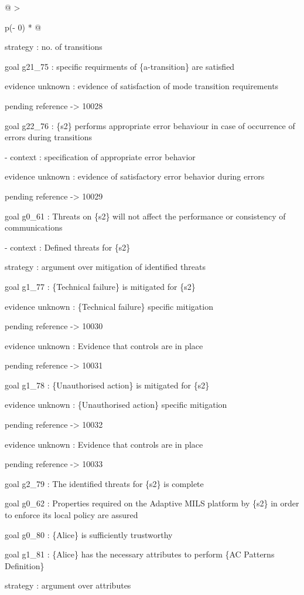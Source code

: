 \documentclass[12pt,twoside,a4paper]{article}
\begin{document}
\begin{longtable}[]{@{}
  >{\raggedright\arraybackslash}p{(\columnwidth - 0\tabcolsep) * }@{}}
\begin{minipage}[b]{\linewidth}
strategy : no. of transitions

goal g21\_75 : specific requirments of \{a-transition\} are satisfied

evidence unknown : evidence of satisfaction of mode transition requirements

pending reference -\textgreater{} 10028

goal g22\_76 : \{s2\} performs appropriate error behaviour in case of occurrence of errors during transitions

- context : specification of appropriate error behavior

evidence unknown : evidence of satisfactory error behavior during errors

pending reference -\textgreater{} 10029

goal g0\_61 : Threats on \{s2\} will not affect the performance or consistency of communications

- context : Defined threats for \{s2\}

strategy : argument over mitigation of identified threats

goal g1\_77 : \{Technical failure\} is mitigated for \{s2\}

evidence unknown : \{Technical failure\} specific mitigation

pending reference -\textgreater{} 10030

evidence unknown : Evidence that controls are in place

pending reference -\textgreater{} 10031

goal g1\_78 : \{Unauthorised action\} is mitigated for \{s2\}

evidence unknown : \{Unauthorised action\} specific mitigation

pending reference -\textgreater{} 10032

evidence unknown : Evidence that controls are in place

pending reference -\textgreater{} 10033

goal g2\_79 : The identified threats for \{s2\} is complete

goal g0\_62 : Properties required on the Adaptive MILS platform by \{s2\} in order to enforce its local policy are assured

goal g0\_80 : \{Alice\} is sufficiently trustworthy

goal g1\_81 : \{Alice\} has the necessary attributes to perform \{AC Patterns Definition\}

strategy : argument over attributes


\end{minipage}
\end{longtable}
\end{document}
